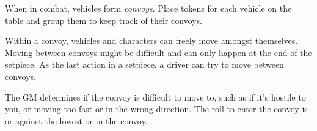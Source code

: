 
When in combat, vehicles form \emph{convoys}. Place tokens for each vehicle on the table and group them to keep track of their convoys.

Within a convoy, vehicles and characters can freely move amongst themselves. Moving between convoys might be difficult and can only happen at the end of the setpiece. As the last action in a setpiece, a driver can try to move between convoys.

The GM determines if the convoy is difficult to move to, such as if it's hostile to you, or moving too fast or in the wrong direction. The roll to enter the convoy is  or  against the lowest  or  in the convoy.
